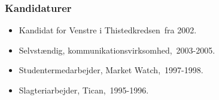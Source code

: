 \documentclass[11pt, a4paper]{awesome-cv}
\begin{document}
\begin{cvletter}
\subsubsection*{Kandidaturer}
\begin{itemize}
\item Kandidat for Venstre i Thistedkredsen fra 2002.
\end{itemize}
\begin{itemize}
\item Selvstændig, kommunikationsvirksomhed, 2003-2005.
\item Studentermedarbejder, Market Watch, 1997-1998.
\item Slagteriarbejder, Tican, 1995-1996.
\end{itemize}
\end{cvletter}
\end{document}
